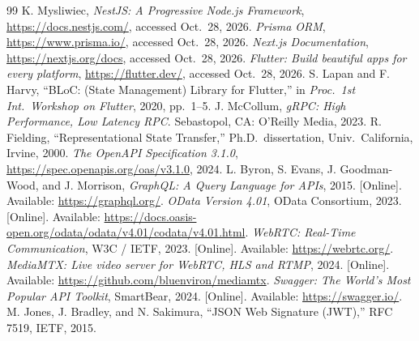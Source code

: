 \documentclass[conference,a4paper]{IEEEtran}
\begin{document}
\begin{IEEEkeywords}
\end{IEEEkeywords}











\begin{thebibliography}{99}
 K. Mysliwiec, \emph{NestJS: A Progressive Node.js Framework}, \url{https://docs.nestjs.com/}, accessed Oct.\ 28, 2026.
 \emph{Prisma ORM}, \url{https://www.prisma.io/}, accessed Oct.\ 28, 2026.
 \emph{Next.js Documentation}, \url{https://nextjs.org/docs}, accessed Oct.\ 28, 2026.
 \emph{Flutter: Build beautiful apps for every platform}, \url{https://flutter.dev/}, accessed Oct.\ 28, 2026.
 S. Lapan and F. Harvy, ``BLoC: (State Management) Library for Flutter,'' in \emph{Proc.\ 1st Int.\ Workshop on Flutter}, 2020, pp.\ 1--5.
 J. McCollum, \emph{gRPC: High Performance, Low Latency RPC}. Sebastopol, CA: O'Reilly Media, 2023.
 R. Fielding, ``Representational State Transfer,'' Ph.D.\ dissertation, Univ.\ California, Irvine, 2000.
 \emph{The OpenAPI Specification 3.1.0}, \url{https://spec.openapis.org/oas/v3.1.0}, 2024.
 L. Byron, S. Evans, J. Goodman-Wood, and J. Morrison, \emph{GraphQL: A Query Language for APIs}, 2015. [Online]. Available: \url{https://graphql.org/}.
 \emph{OData Version 4.01}, OData Consortium, 2023. [Online]. Available: \url{https://docs.oasis-open.org/odata/odata/v4.01/codata/v4.01.html}.
 \emph{WebRTC: Real-Time Communication}, W3C / IETF, 2023. [Online]. Available: \url{https://webrtc.org/}.
 \emph{MediaMTX: Live video server for WebRTC, HLS and RTMP}, 2024. [Online]. Available: \url{https://github.com/bluenviron/mediamtx}.
 \emph{Swagger: The World's Most Popular API Toolkit}, SmartBear, 2024. [Online]. Available: \url{https://swagger.io/}.
 M. Jones, J. Bradley, and N. Sakimura, ``JSON Web Signature (JWT),'' RFC 7519, IETF, 2015.

\end{thebibliography}
\end{document}
